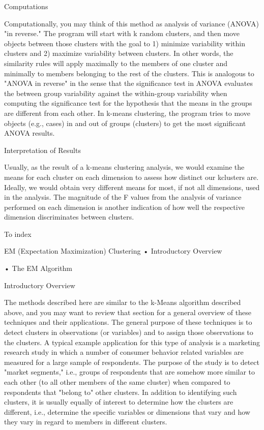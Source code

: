 Computations

Computationally, you may think of this method as analysis of variance (ANOVA) "in reverse." The program will start with k random clusters, and then move objects between those clusters with the goal to 1) minimize variability within clusters and 2) maximize variability between clusters. In other words, the similarity rules will apply maximally to the members of one cluster and minimally to members belonging to the rest of the clusters. This is analogous to "ANOVA in reverse" in the sense that the significance test in ANOVA evaluates the between group variability against the within-group variability when computing the significance test for the hypothesis that the means in the groups are different from each other. In k-means clustering, the program tries to move objects (e.g., cases) in and out of groups (clusters) to get the most significant ANOVA results.

Interpretation of Results

Usually, as the result of a k-means clustering analysis, we would examine the means for each cluster on each dimension to assess how distinct our kclusters are. Ideally, we would obtain very different means for most, if not all dimensions, used in the analysis. The magnitude of the F values from the analysis of variance performed on each dimension is another indication of how well the respective dimension discriminates between clusters.







To index
 



 


EM (Expectation Maximization) Clustering
•
Introductory Overview

•
The EM Algorithm


Introductory Overview

The methods described here are similar to the k-Means algorithm described above, and you may want to review that section for a general overview of these techniques and their applications. The general purpose of these techniques is to detect clusters in observations (or variables) and to assign those observations to the clusters. A typical example application for this type of analysis is a marketing research study in which a number of consumer behavior related variables are measured for a large sample of respondents. The purpose of the study is to detect "market segments," i.e., groups of respondents that are somehow more similar to each other (to all other members of the same cluster) when compared to respondents that "belong to" other clusters. In addition to identifying such clusters, it is usually equally of interest to determine how the clusters are different, i.e., determine the specific variables or dimensions that vary and how they vary in regard to members in different clusters.

